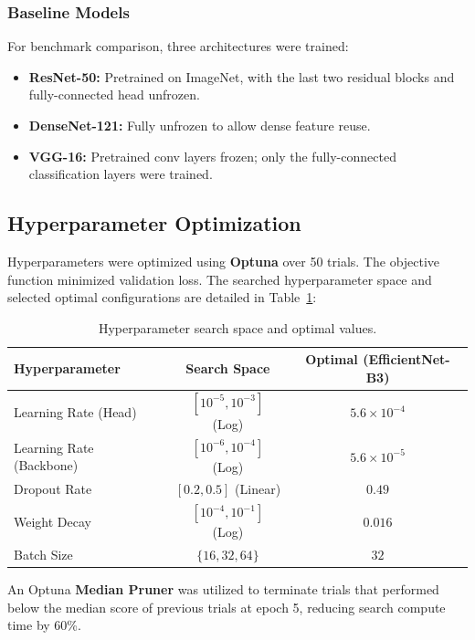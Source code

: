 \documentclass[11pt,journal,compsoc]{IEEEtran}
\begin{document}
\subsubsection{Baseline Models}
For benchmark comparison, three architectures were trained:
\begin{itemize}
    \item \textbf{ResNet-50:} Pretrained on ImageNet, with the last two residual blocks and fully-connected head unfrozen.
    \item \textbf{DenseNet-121:} Fully unfrozen to allow dense feature reuse.
    \item \textbf{VGG-16:} Pretrained conv layers frozen; only the fully-connected classification layers were trained.
\end{itemize}

\subsection{Hyperparameter Optimization}
Hyperparameters were optimized using \textbf{Optuna} over 50 trials. The objective function minimized validation loss. The searched hyperparameter space and selected optimal configurations are detailed in Table~\ref{tab:hyperparams}:

\begin{table}[h]
\centering
\caption{Hyperparameter search space and optimal values.}
\label{tab:hyperparams}
\begin{tabular}{lcc}
\toprule
Hyperparameter & Search Space & Optimal (EfficientNet-B3) \\
\midrule
Learning Rate (Head) & $[10^{-5}, 10^{-3}]$ (Log) & $5.6 \times 10^{-4}$ \\
Learning Rate (Backbone) & $[10^{-6}, 10^{-4}]$ (Log) & $5.6 \times 10^{-5}$ \\
Dropout Rate & $[0.2, 0.5]$ (Linear) & $0.49$ \\
Weight Decay & $[10^{-4}, 10^{-1}]$ (Log) & $0.016$ \\
Batch Size & $\{16, 32, 64\}$ & $32$ \\
\bottomrule
\end{tabular}
\end{table}

An Optuna \textbf{Median Pruner} was utilized to terminate trials that performed below the median score of previous trials at epoch 5, reducing search compute time by 60\%.
\end{document}
